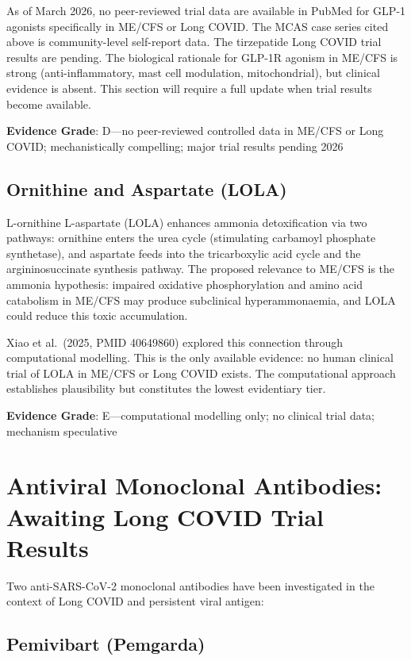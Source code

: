 \begin{limitation}
As of March 2026, no peer-reviewed trial data are available in PubMed for GLP-1 agonists specifically in ME/CFS or Long COVID. The MCAS case series cited above is community-level self-report data. The tirzepatide Long COVID trial results are pending. The biological rationale for GLP-1R agonism in ME/CFS is strong (anti-inflammatory, mast cell modulation, mitochondrial), but clinical evidence is absent. This section will require a full update when trial results become available.
\end{limitation}

\textbf{Evidence Grade}: D---no peer-reviewed controlled data in ME/CFS or Long COVID; mechanistically compelling; major trial results pending 2026

\subsection{Ornithine and Aspartate (LOLA)}
\label{subsec:lola}

L-ornithine L-aspartate (LOLA) enhances ammonia detoxification via two pathways: ornithine enters the urea cycle (stimulating carbamoyl phosphate synthetase), and aspartate feeds into the tricarboxylic acid cycle and the argininosuccinate synthesis pathway. The proposed relevance to ME/CFS is the ammonia hypothesis: impaired oxidative phosphorylation and amino acid catabolism in ME/CFS may produce subclinical hyperammonaemia, and LOLA could reduce this toxic accumulation.

Xiao et al.\ (2025, PMID 40649860) explored this connection through computational modelling. This is the only available evidence: no human clinical trial of LOLA in ME/CFS or Long COVID exists. The computational approach establishes plausibility but constitutes the lowest evidentiary tier.

\textbf{Evidence Grade}: E---computational modelling only; no clinical trial data; mechanism speculative

\section{Antiviral Monoclonal Antibodies: Awaiting Long COVID Trial Results}
\label{sec:antiviral-mab}

Two anti-SARS-CoV-2 monoclonal antibodies have been investigated in the context of Long COVID and persistent viral antigen:

\subsection{Pemivibart (Pemgarda)}
\label{subsec:pemivibart}

